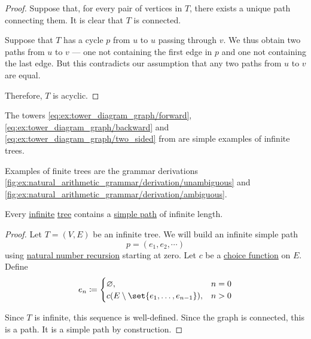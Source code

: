 \begin{proof}
   Suppose that, for every pair of vertices in \( T \), there exists a unique path connecting them. It is clear that \( T \) is connected.

  Suppose that \( T \) has a cycle \( p \) from \( u \) to \( u \) passing through \( v \). We thus obtain two paths from \( u \) to \( v \) --- one not containing the first edge in \( p \) and one not containing the last edge. But this contradicts our assumption that any two paths from \( u \) to \( v \) are equal.

  Therefore, \( T \) is acyclic.
\end{proof}

\begin{example}\label{ex:def:tree}
  The towers \eqref{eq:ex:tower_diagram_graph/forward}, \eqref{eq:ex:tower_diagram_graph/backward} and \eqref{eq:ex:tower_diagram_graph/two_sided} from  are simple examples of infinite trees.

  Examples of finite trees are the grammar derivations \cref{fig:ex:natural_arithmetic_grammar/derivation/unambiguous} and \cref{fig:ex:natural_arithmetic_grammar/derivation/ambiguous}.
\end{example}

\begin{theorem}\label{thm:konigs_lemma}
  Every \hyperref[def:graph/order]{infinite} \hyperref[def:tree]{tree} contains a \hyperref[def:graph_adjancency_chain/simple]{simple path} of infinite length.
\end{theorem}
\begin{proof}
  Let \( T = (V, E) \) be an infinite tree. We will build an infinite simple path
  \begin{equation*}
    p = (e_1, e_2, \cdots)
  \end{equation*}
  using \hyperref[rem:natural_number_recursion]{natural number recursion} starting at zero. Let \( c \) be a \hyperref[def:choice_function]{choice function} on \( E \). Define
  \begin{equation*}
    e_n \coloneqq \begin{cases}
      \varnothing,                                 &n = 0 \\
      c(E \setminus \set{ e_1, \ldots, e_{n-1} }), &n > 0
    \end{cases}
  \end{equation*}

  Since \( T \) is infinite, this sequence is well-defined. Since the graph is connected, this is a path. It is a simple path by construction.
\end{proof}

